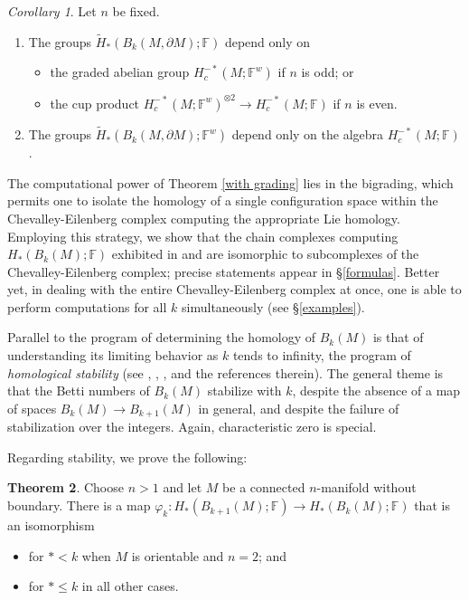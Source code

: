 \documentclass{compositio}
\theoremstyle{definition}\newtheorem{definition}{Definition}[section]
\theoremstyle{theorem}\newtheorem{lemma}[definition]{Lemma}
\theoremstyle{remark}\newtheorem*{conventions}{Conventions}
\theoremstyle{remark}\newtheorem*{acknowledgments}{Acknowledgments}
\theoremstyle{remark}\newtheorem*{outline}{Outline}
\theoremstyle{remark}\newtheorem*{questions}{Questions}
\theoremstyle{remark}\newtheorem{example}[definition]{Example}
\theoremstyle{definition}\newtheorem{construction}[definition]{Construction}
\theoremstyle{definition}\newtheorem*{convention}{Convention}
\theoremstyle{definition}\newtheorem*{conjecture}{Conjecture}
\theoremstyle{theorem}\newtheorem{theorem}[definition]{Theorem}
\theoremstyle{theorem}\newtheorem{paradigm}[definition]{Paradigm}
\theoremstyle{remark}\newtheorem{remark}[definition]{Remark}
\theoremstyle{corollary}\newtheorem{corollary}[definition]{Corollary}
\theoremstyle{theorem}\newtheorem{proposition}[definition]{Proposition}
\theoremstyle{definition}\newtheorem{question}[definition]{Question}
\begin{document}
\begin{corollary}\label{main corollary} Let $n$ be fixed. \begin{enumerate}\item The groups $\widetilde{H}_*(B_k(M,\partial M);\mathbb{F})$ depend only on
\begin{itemize}
\item the graded abelian group $H_c^{-*}(M;\mathbb{F}^w)$ if $n$ is odd; or
\item the cup product $H_{c}^{-*}(M;\mathbb{F}^w)^{\otimes 2}\to H_c^{-*}(M;\mathbb{F})$ if $n$ is even.
\end{itemize}
\item The groups $\widetilde{H}_*(B_k(M,\partial M);\mathbb{F}^w)$ depend only on the algebra $H_c^{-*}(M;\mathbb{F})$.
\end{enumerate}
\end{corollary}

The computational power of Theorem \ref{with grading} lies in the bigrading, which permits one to isolate the homology of a single configuration space within the Chevalley-Eilenberg complex computing the appropriate Lie homology. Employing this strategy, we show that the chain complexes computing $H_*(B_k(M);\mathbb{F})$ exhibited in \cite{BCT} and \cite{FT} are isomorphic to subcomplexes of the Chevalley-Eilenberg complex; precise statements appear in \S\ref{formulas}. Better yet, in dealing with the entire Chevalley-Eilenberg complex at once, one is able to perform computations for all $k$ simultaneously (see \S\ref{examples}).

Parallel to the program of determining the homology of $B_k(M)$ is that of understanding its limiting behavior as $k$ tends to infinity, the program of \emph{homological stability} (see \cite{Church}, \cite{CEF}, \cite{ORWstab}, and the references therein). The general theme is that the Betti numbers of $B_k(M)$ stabilize with $k$, despite the absence of a map of spaces $B_k(M)\to B_{k+1}(M)$ in general, and despite the failure of stabilization over the integers. Again, characteristic zero is special. 

Regarding stability, we prove the following:

\begin{theorem}\label{stability theorem}
Choose $n>1$ and let $M$ be a connected $n$-manifold without boundary. There is a map $\varphi_k:H_*(B_{k+1}(M);\mathbb{F})\to H_*(B_k(M);\mathbb{F})$ that is an isomorphism \begin{itemize}
\item for $*<k$ when $M$ is orientable and $n=2$; and
\item for $*\leq k$ in all other cases.
\end{itemize}
\end{theorem}
\end{document}
